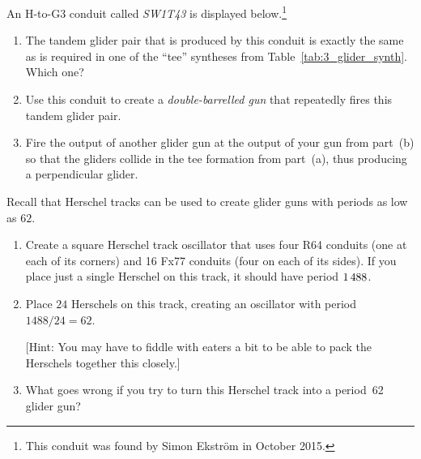 \begin{multicols}{2}
\mfilbreak


\begin{problem}\label{exer:herschel_tee}
	An H-to-G3 conduit called \emph{SW1T43} is displayed below.\footnote{This conduit was found by Simon Ekstr\"{o}m in October 2015.}
	
	\begin{center}
	\end{center}

	\begin{enumerate}[label=\bf\color{ocre}(\alph*)]
		\item {} The tandem glider pair that is produced by this conduit is exactly the same as is required in one of the ``tee'' syntheses from Table~\ref{tab:3_glider_synth}. Which one?
		
		\item {} Use this conduit to create a \emph{double-barrelled gun} that repeatedly fires this tandem glider pair.
		
		\item {} Fire the output of another glider gun at the output of your gun from part~(b) so that the gliders collide in the tee formation from part~(a), thus producing a perpendicular glider.
	\end{enumerate}
\end{problem}

	
	\mfilbreak
	
	
	\begin{problem}\label{exer:p62_gun_problem}
		Recall that Herschel tracks can be used to create glider guns with periods as low as $62$.\smallskip
		
		\begin{enumerate}[label=\bf\color{ocre}(\alph*)]
			\item {} Create a square Herschel track oscillator that uses four R64 conduits (one at each of its corners) and 16 Fx77 conduits (four on each of its sides). If you place just a single Herschel on this track, it should have period $1{\,}488$.
			
			\item {} Place $24$ Herschels on this track, creating an oscillator with period $1488/24 = 62$.
			
			[Hint: You may have to fiddle with eaters a bit to be able to pack the Herschels together this closely.]
			
			\item {} What goes wrong if you try to turn this Herschel track into a period~62 glider gun? %
			

\end{enumerate}
\end{problem}
\end{multicols}

